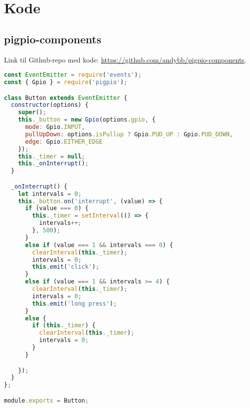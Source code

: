 
\chapter{Kode}

\section{pigpio-components}
\label{appendix:pigpio-components}
Link til Github-repo med kode: \url{https://github.com/andybb/pigpio-components}.

\begin{lstlisting}[frame=single, language=JavaScript,
    caption=pigpio-components: Button class, label=lst:pigpio-components-button]
const EventEmitter = require('events');
const { Gpio } = require('pigpio');

class Button extends EventEmitter {
  constructor(options) {
    super();
    this._button = new Gpio(options.gpio, {
      mode: Gpio.INPUT,
      pullUpDown: options.isPullup ? Gpio.PUD_UP : Gpio.PUD_DOWN,
      edge: Gpio.EITHER_EDGE
    });
    this._timer = null;
    this._onInterrupt();
  }

  _onInterrupt() {
    let intervals = 0;
    this._button.on('interrupt', (value) => {
      if (value === 0) {
        this._timer = setInterval(() => {
          intervals++;
        }, 500);
      }
      else if (value === 1 && intervals === 0) {
        clearInterval(this._timer);
        intervals = 0;
        this.emit('click');
      }
      else if (value === 1 && intervals >= 4) {
        clearInterval(this._timer);
        intervals = 0;
        this.emit('long press');
      }
      else {
        if (this._timer) {
          clearInterval(this._timer);
          intervals = 0;
        }
      }

    });
  }
};

module.exports = Button;

\end{lstlisting}

